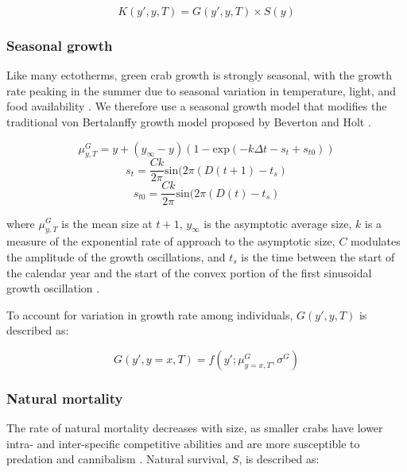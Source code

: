 \documentclass{article}
\begin{document}
\begin{equation}
K(y',y, T) = G(y',y, T) \times S(y)
\end{equation}

\subsubsection*{Seasonal growth}

Like many ectotherms, green crab growth is strongly seasonal, with the growth rate peaking in the summer due to seasonal variation in temperature, light, and food availability \parencite{contreras2003population, garcia2012technical}. We therefore use a seasonal growth model that modifies the traditional von Bertalanffy growth model proposed by Beverton and Holt \parencite{beverton2012dynamics, somers1988seasonally}.

\begin{equation}
\mu^G_{y,T} = y + (y_{\infty}-y)(1-\text{exp}(-k\Delta t-s_t+s_{t0}))
\end{equation}
\begin{equation}
s_t = \frac{Ck}{2\pi} \text{sin}(2\pi(D(t+1)-t_s)
\end{equation}
\begin{equation}
s_{t0} = \frac{Ck}{2\pi} \text{sin}(2\pi(D(t)-t_s)
\end{equation}

where $\mu^G_{y,T}$ is the mean size at $t+1$, $y_{\infty}$ is the asymptotic average size, $k$ is a measure of the exponential rate of approach to the asymptotic size, $C$ modulates the amplitude of the growth oscillations, and $t_s$ is the time between the start of the calendar year and the start of the convex portion of the first sinusoidal growth oscillation \parencite{garcia2012technical}.

To account for variation in growth rate among individuals, $G(y',y, T)$ is described as:

\begin{equation}
G(y',y=x, T) = f(y'; \mu^G_{y=x, T}, \sigma^G)
\end{equation}

\subsubsection*{Natural mortality}

The rate of natural mortality decreases with size, as smaller crabs have lower intra- and inter-specific competitive abilities and are more susceptible to predation and cannibalism \parencite{maszczyk2018body, grosholz2021stage}. Natural survival, $S$, is described as: 
\end{document}
